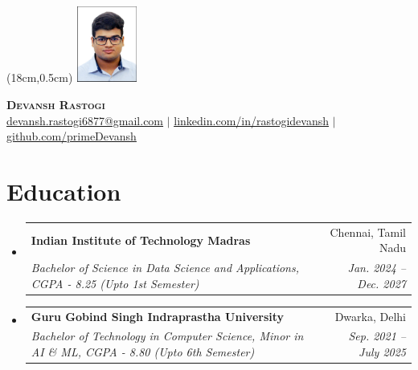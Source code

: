 \documentclass[letterpaper,9pt]{article}
\makeatletter
\newcommand{\resumeSubheading}[4]{
  \vspace{-2pt}\item
    \begin{tabular*}{0.97\textwidth}[t]{l@{\extracolsep{\fill}}r}
      \textbf{#1} & #2 \\
      \textit{\small#3} & \textit{\small #4} \\
    \end{tabular*}\vspace{-7pt}
}
\newcommand{\resumeSubHeadingListStart}{\begin{itemize}[leftmargin=0.15in, label={}]}
\newcommand{\resumeSubHeadingListEnd}{\end{itemize}}
\makeatother
\begin{document}
\begin{textblock*}{2cm}(18cm,0.5cm) %
  \includegraphics[width=2cm,height=2.5cm,keepaspectratio]{photo.jpg}
\end{textblock*}
\begin{center}
    \textbf{\Huge \scshape Devansh Rastogi} \\ \vspace{10pt}
    \small \href{mailto:dvcam.rastogi1980@gmail.com}{\underline{devansh.rastogi6877@gmail.com}} $|$ 
    \href{https://linkedin.com/in/rastogidevansh}{\underline{linkedin.com/in/rastogidevansh}} $|$
    \href{https://github.com/primeDevansh}{\underline{github.com/primeDevansh}}
\end{center}

\section{Education}
  \resumeSubHeadingListStart
    \resumeSubheading
      {Indian Institute of Technology Madras}{Chennai, Tamil Nadu}
      {Bachelor of Science in Data Science and Applications, CGPA - 8.25 (Upto 1st Semester)}{Jan. 2024 -- Dec. 2027}
    \resumeSubheading
      {Guru Gobind Singh Indraprastha University}{Dwarka, Delhi}
      {Bachelor of Technology in Computer Science, Minor in AI \& ML, CGPA - 8.80 (Upto 6th Semester)}{Sep. 2021 -- July 2025}
  \resumeSubHeadingListEnd

\end{document}

